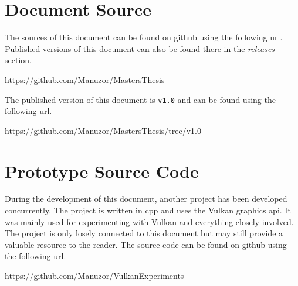 
\appendix


%
%
\renewcommand\lstlistlistingname{List of Listings}
\lstlistoflistings


%
%
\listoffigures


%
%




%
%
\chapter{Document Source}
  \label{apx:DocumentSource}
  The sources of this document can be found on \gls{github} using the following \acrshort{url}.
  Published versions of this document can also be found there in the \textit{releases} section.
  \newline

  \noindent
  \url{https://github.com/Manuzor/MastersThesis}
  \newline

  \noindent
  The published version of this document is \lstinline{v1.0} and can be found using the following \acrshort{url}.
  \newline

  \noindent
  \url{https://github.com/Manuzor/MastersThesis/tree/v1.0}


%
%
\chapter{Prototype Source Code}
  \label{apx:PrototypeSource}
  During the development of this document, another project has been developed concurrently.
  The project is written in \gls{cpp} and uses the Vulkan graphics \gls{api}.
  It was mainly used for experimenting with Vulkan and everything closely involved.
  The project is only losely connected to this document but may still provide a valuable resource to the reader.
  The source code can be found on \gls{github} using the following \acrshort{url}.
  \newline

  \noindent
  \url{https://github.com/Manuzor/VulkanExperiments}

